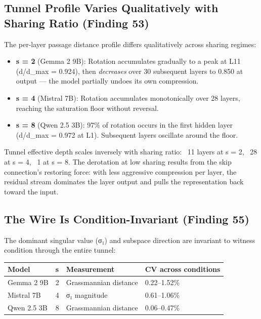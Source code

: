 \documentclass[12pt]{article}
\begin{document}
\subsection{Tunnel Profile Varies Qualitatively with Sharing Ratio (Finding 53)}

The per-layer passage distance profile differs qualitatively across sharing regimes:

\begin{itemize}
\item \textbf{s = 2} (Gemma 2 9B): Rotation accumulates gradually to a peak at L11 (d/d\_max = 0.924), then \textit{decreases} over 30 subsequent layers to 0.850 at output — the model partially undoes its own compression.
\item \textbf{s = 4} (Mistral 7B): Rotation accumulates monotonically over 28 layers, reaching the saturation floor without reversal.
\item \textbf{s = 8} (Qwen 2.5 3B): 97\% of rotation occurs in the first hidden layer (d/d\_max = 0.972 at L1). Subsequent layers oscillate around the floor.
\end{itemize}

Tunnel effective depth scales inversely with sharing ratio: ~11 layers at s = 2, ~28 at s = 4, ~1 at s = 8. The derotation at low sharing results from the skip connection's restoring force: with less aggressive compression per layer, the residual stream dominates the layer output and pulls the representation back toward the input.

\subsection{The Wire Is Condition-Invariant (Finding 55)}

The dominant singular value (σ₁) and subspace direction are invariant to witness condition through the entire tunnel:

\begin{table}[h]
\centering
\small
\begin{tabular}{llll}
\toprule
\textbf{Model} & \textbf{s} & \textbf{Measurement} & \textbf{CV across conditions} \\
\midrule
Gemma 2 9B & 2 & Grassmannian distance & 0.22–1.52\% \\
Mistral 7B & 4 & σ₁ magnitude & 0.61–1.06\% \\
Qwen 2.5 3B & 8 & Grassmannian distance & 0.06–0.47\% \\
\bottomrule
\end{tabular}
\end{table}
\end{document}
